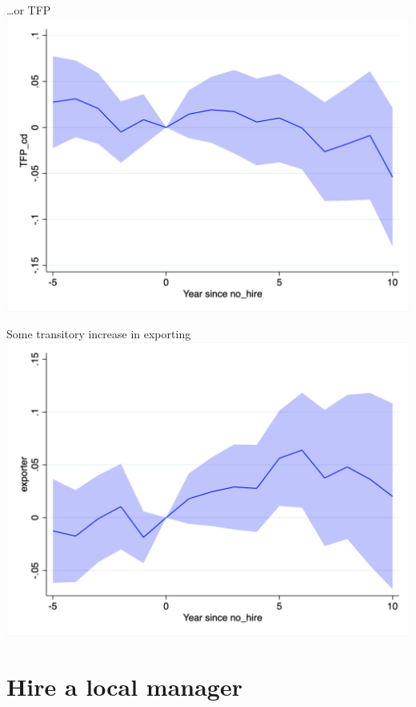 \documentclass[
  ignorenonframetext,
  aspectratio=43,
]{beamer}
\begin{document}
\begin{frame}{\ldots or TFP}
\protect\hypertarget{or-tfp}{}
\includegraphics{figure/event_study/no_hire_TFP_cd.png}
\end{frame}

\begin{frame}{Some transitory increase in exporting}
\protect\hypertarget{some-transitory-increase-in-exporting}{}
\includegraphics{figure/event_study/no_hire_exporter.png}
\end{frame}

\hypertarget{hire-a-local-manager}{%
\section{Hire a local manager}\label{hire-a-local-manager}}
\end{document}
